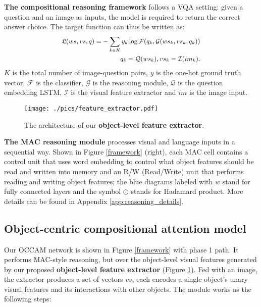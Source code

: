 \documentclass[10pt,twocolumn,letterpaper]{article}
\begin{document}
\textbf{The compositional reasoning framework} follows a VQA setting: given a question and an image as inputs, the model is required to return the correct answer choice. The target function can thus be written as:
\begin{equation}
\small
\vspace{-2mm}
\begin{split}
    \mathfrak{L}(ws, vs, q) = -\sum_{k \in K} y_k \log \mathcal{F}(q_k, \mathcal{G}(ws_k, vs_k, q_k)) \\
    q_k = \mathcal{Q}(ws_k), vs_k = \mathcal{I}(im_k).
    \label{loss_fn}
\end{split}
\vspace{-2mm}
\end{equation}
$K$ is the total number of image-question pairs, $y$ is the one-hot ground truth vector, $\mathcal{F}$ is the classifier, $\mathcal{G}$ is the reasoning module, $\mathcal{Q}$ is the question embedding LSTM, $\mathcal{I}$ is the visual feature extractor and $im$ is the image input.



\begin{figure}[t]
\centering
\texttt{[image: ./pics/feature\_extractor.pdf]}
\caption{\small{The architecture of our \textbf{object-level feature extractor}.}}
\label{ext}
\vspace{-5mm}
\end{figure}

\textbf{The MAC reasoning module} \cite{hudson2018compositional}
processes visual and language inputs in a sequential way. 
Shown in Figure \ref{framework} (right), each MAC cell contains a control unit that uses word embedding to control what object features should be read and written into memory and an R/W (Read/Write) unit that performs reading and writing object features; the blue diagrams labeled with $w$ stand for fully connected layers and the symbol $\odot$ stands for Hadamard product. 
More details can be found in Appendix \ref{app:reasoning_details}.










\vspace{-2mm}
\subsection{Object-centric compositional attention model}
\vspace{-2mm}
\label{ssec:object_mac}
Our OCCAM network is shown in Figure \ref{framework} with phase 1 path.
It performs MAC-style reasoning, but over the object-level visual features generated by our proposed \textbf{object-level feature extractor} (Figure \ref{ext}).
Fed with an image, the extractor produces a set of vectors $vs$, each encodes a single object's unary visual features and its interactions with other objects. The module works as the following steps:
\end{document}
